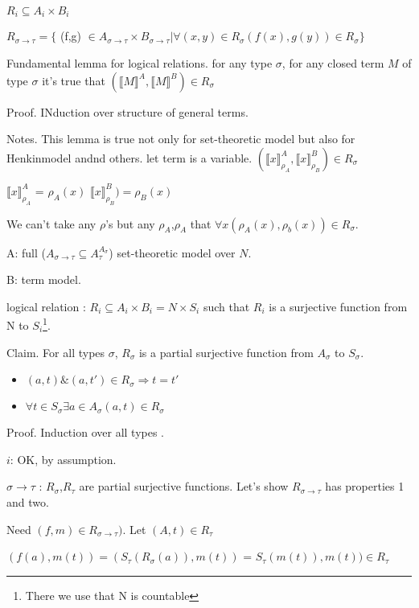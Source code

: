 \documentclass[a4paper,10pt]{book}
\newcommand{\sem}[2]{ \llbracket#1\rrbracket_{#2} }
\begin{document}
$R_i \subseteq A_i \times B_i$

$R_{\sigma \rightarrow  \tau} = \{$ (f,g) $\in A_{\sigma \rightarrow \tau} \times
B_{\sigma \rightarrow \tau} |
\forall (x,y) \in R_\sigma (f(x), g(y)) \in R_\sigma \}$

Fundamental lemma for logical relations.
for any type $\sigma$, for any closed term $M$ of type $\sigma$ it's true that 
$(\sem{M}{} ^A, \sem{M}{} ^B) \in R_\sigma$

Proof. INduction over structure of general terms.

Notes. This lemma is true not only for set-theoretic model but also for Henkinmodel andnd
others.
let term is a variable. $(\sem{x}{\rho_A}^A, \sem{x}{\rho_B}^B) \in R_\sigma$

$\sem{x}{\rho_A}^A$ = $\rho_A(x)$
$\sem{x}{\rho_B}^B) = \rho_B(x)$

We can't take any $\rho$'s but any $\rho_A$,$\rho_A$ that $\forall x (\rho_A(x), \rho_b(x)) \in R_\sigma$.


A: full ($A_{\sigma \rightarrow \tau} \subseteq A_{\tau}^{A_\sigma}$) set-theoretic model over $N$.

B: term model.

logical relation : $R_i \subseteq A_i \times B_i = N \times S_i$ such that $R_i$ is a surjective 
function from N to $S_i$\footnote{There we use that N is countable}.

Claim. For all types $\sigma$, $R_\sigma$ is a partial surjective function from $A_\sigma$ to $S_\sigma$.

\begin{itemize}
 \item $(a,t) \& (a,t') \in R_\sigma \Rightarrow t = t'$
 \item $\forall t \in S_\sigma \exists a  \in A_\sigma (a,t) \in R_\sigma$
\end{itemize}

Proof. Induction over all types .

$i$: OK, by assumption.

$\sigma \rightarrow \tau$ : $R_\sigma$,$R_\tau$ are partial surjective functions. Let's show 
$R_{\sigma \rightarrow \tau}$ has properties 1 and two.


Need $(f,m) \in R_{\sigma \rightarrow \tau})$. Let $(A,t) \in R_\tau$

$(f(a), m(t)) = (S_\tau(R_\sigma(a)), m(t))$ = $S_\tau(m(t)), m(t)) \in R_\tau$
\end{document}
